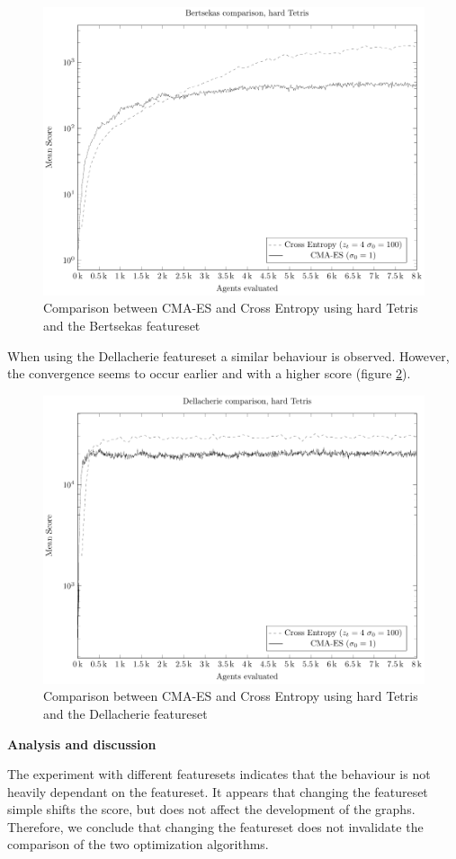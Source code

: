 \begin{figure}[H]
\includegraphics[scale=1]{plots/plotBertsekasCmaVsCEHardTetris}
\caption{Comparison between CMA-ES and Cross Entropy 
using hard Tetris and the Bertsekas featureset 
\label{fig:featuresetCompareBertsekas}}
\end{figure}

When using the Dellacherie featureset a similar behaviour is observed.
However, the convergence seems to occur earlier and with a higher score
(figure \ref{fig:featuresetCompareDellacherie}).

\begin{figure}[H]
\includegraphics[scale=1]{plots/plotDellCmaVsCEHardTetris}
\caption{Comparison between CMA-ES and Cross Entropy 
using hard Tetris and the Dellacherie featureset
\label{fig:featuresetCompareDellacherie}}
\end{figure}

\textbf{Analysis and discussion}

The experiment with different featuresets indicates that the behaviour 
is not heavily dependant on the featureset.
It appears that changing the featureset simple shifts the score, but does not affect the development of the graphs.\\
Therefore, we conclude that changing the featureset does not invalidate
the comparison of the two optimization algorithms.

